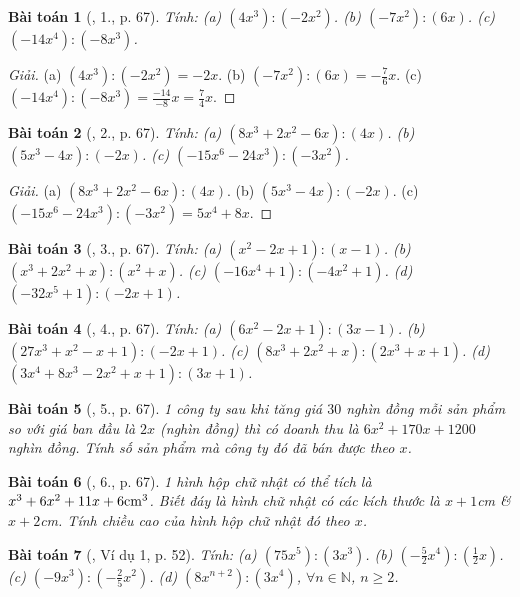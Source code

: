 \documentclass{article}
\newtheorem{baitoan}{Bài toán}
\begin{document}
\begin{baitoan}[\cite{SGK_Toan_7_Canh_Dieu_tap_2}, 1., p. 67]
	Tính: (a) $(4x^3):(-2x^2)$. (b) $(-7x^2):(6x)$. (c) $(-14x^4):(-8x^3)$.
\end{baitoan}

\begin{proof}[Giải]
	(a) $(4x^3):(-2x^2) = -2x$. (b) $(-7x^2):(6x) = -\frac{7}{6}x$. (c) $(-14x^4):(-8x^3) = \frac{-14}{-8}x = \frac{7}{4}x$.
\end{proof}

\begin{baitoan}[\cite{SGK_Toan_7_Canh_Dieu_tap_2}, 2., p. 67]
	Tính: (a) $(8x^3 + 2x^2 - 6x):(4x)$. (b) $(5x^3 - 4x):(-2x)$. (c) $(-15x^6 - 24x^3):(-3x^2)$.
\end{baitoan}

\begin{proof}[Giải]
	(a) $(8x^3 + 2x^2 - 6x):(4x)$. (b) $(5x^3 - 4x):(-2x)$. (c) $(-15x^6 - 24x^3):(-3x^2) = 5x^4 + 8x$.
\end{proof}

\begin{baitoan}[\cite{SGK_Toan_7_Canh_Dieu_tap_2}, 3., p. 67]
	Tính: (a) $(x^2 - 2x + 1):(x - 1)$. (b) $(x^3 + 2x^2 + x):(x^2 + x)$. (c) $(-16x^4 + 1):(-4x^2 + 1)$. (d) $(-32x^5 + 1):(-2x + 1)$.
\end{baitoan}

\begin{baitoan}[\cite{SGK_Toan_7_Canh_Dieu_tap_2}, 4., p. 67]
	Tính: (a) $(6x^2 - 2x + 1):(3x - 1)$. (b) $(27x^3 + x^2 - x + 1):(-2x + 1)$. (c) $(8x^3 + 2x^2 + x):(2x^3 + x + 1)$. (d) $(3x^4 + 8x^3 - 2x^2 + x + 1):(3x + 1)$.
\end{baitoan}

\begin{baitoan}[\cite{SGK_Toan_7_Canh_Dieu_tap_2}, 5., p. 67]
	1 công ty sau khi tăng giá $30$ nghìn đồng mỗi sản phẩm so với giá ban đầu là $2x$ (nghìn đồng) thì có doanh thu là $6x^2 + 170x + 1200$ nghìn đồng. Tính số sản phẩm mà công ty đó đã bán được theo $x$.
\end{baitoan}

\begin{baitoan}[\cite{SGK_Toan_7_Canh_Dieu_tap_2}, 6., p. 67]
	1 hình hộp chữ nhật có thể tích là $x^3 + 6x^2 + 11x + 6{\rm cm}^3$. Biết đáy là hình chữ nhật có các kích thước là $x + 1$\emph{cm} \& $x + 2$\emph{cm}. Tính chiều cao của hình hộp chữ nhật đó theo $x$.
\end{baitoan}

\begin{baitoan}[\cite{SBT_Toan_7_Canh_Dieu_tap_2}, Ví dụ 1, p. 52]
	Tính: (a) $(75x^5):(3x^3)$. (b) $\left(-\frac{5}{2}x^4\right):\left(\frac{1}{2}x\right)$. (c) $(-9x^3):\left(-\frac{2}{5}x^2\right)$. (d) $(8x^{n+2}):(3x^4)$, $\forall n\in\mathbb{N}$, $n\ge2$.
\end{baitoan}
\end{document}
